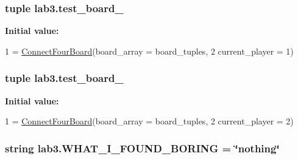 \subsubsection[{test\+\_\+board\+\_\+1}]{\setlength{\rightskip}{0pt plus 5cm}tuple lab3.\+test\+\_\+board\+\_}\label{namespacelab3_a7c477dab1b106f5495518ad07afa5a16}
{\bfseries Initial value\+:}
\begin{DoxyCode}
1 = \hyperlink{classconnectfour_1_1_connect_four_board}{ConnectFourBoard}(board\_array = board\_tuples,
2                                     current\_player = 1)
\end{DoxyCode}
\hypertarget{namespacelab3_a0cf494dec1c4e8b319a04e3b8b967cf3}{}
\subsubsection[{test\+\_\+board\+\_\+2}]{\setlength{\rightskip}{0pt plus 5cm}tuple lab3.\+test\+\_\+board\+\_}\label{namespacelab3_a0cf494dec1c4e8b319a04e3b8b967cf3}
{\bfseries Initial value\+:}
\begin{DoxyCode}
1 = \hyperlink{classconnectfour_1_1_connect_four_board}{ConnectFourBoard}(board\_array = board\_tuples,
2                                     current\_player = 2)
\end{DoxyCode}
\hypertarget{namespacelab3_a2d4ca0461367d56429a6e110bdc70c9c}{}
\subsubsection[{W\+H\+A\+T\+\_\+\+I\+\_\+\+F\+O\+U\+N\+D\+\_\+\+B\+O\+R\+I\+N\+G}]{\setlength{\rightskip}{0pt plus 5cm}string lab3.\+W\+H\+A\+T\+\_\+\+I\+\_\+\+F\+O\+U\+N\+D\+\_\+\+B\+O\+R\+I\+N\+G = \char`\"{}nothing\char`\"{}}\label{namespacelab3_a2d4ca0461367d56429a6e110bdc70c9c}
\hypertarget{namespacelab3_ac6298332137ba3ffbfa88449a0d8add2}{}
